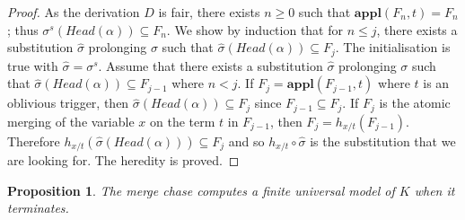 \documentclass{article}
\newtheorem{proposition}{Proposition}[section]
\theoremstyle{definition}
\newtheorem{definition}{Definition}[section]
\theoremstyle{remark}
\def \N {\mathbb N}
\newcommand{\tr}{\textit{tr}}
\newcommand{\Vars}{\textbf{Vars}}
\newcommand{\Appl}{\textbf{appl}}
\begin{document}
\begin{proof}
	As the derivation $D$ is fair, there exists $n \geq 0$ such that $\Appl(F_n,t) = F_n$; thus $\sigma^s(\textit{Head}(\alpha)) \subseteq F_n$.
	We show by induction that for $n\leq j $, there exists a substitution $\hat \sigma$ prolonging $\sigma$ such that $\hat \sigma(\textit{Head}(\alpha)) \subseteq F_j$. The initialisation is true with $\hat \sigma = \sigma^s$. Assume that there exists a substitution $\hat \sigma$ prolonging $\sigma$ such that $\hat \sigma(\textit{Head}(\alpha)) \subseteq F_{j-1}$ where $n < j$. If $F_j = \Appl(F_{j-1},t)$ where $t$ is an oblivious trigger, then $\hat \sigma(\textit{Head}(\alpha)) \subseteq F_{j}$ since $F_{j-1} \subseteq F_j$. If $F_j$ is the atomic merging of the variable $x$ on the term $t$ in $F_{j-1}$, then $F_j = h_{x/t}(F_{j-1})$. Therefore $h_{x/t}(\hat \sigma(\textit{Head}(\alpha))) \subseteq F_j$ and so $h_{x/t} \circ \hat \sigma$ is the substitution that we are looking for. The heredity is proved.
\end{proof}






\begin{proposition} \label{finite <- terminates}
The merge chase computes a finite universal model of $K$ when it terminates.
\end{proposition}
\end{document}
